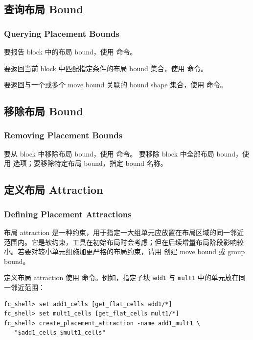\subsection{查询布局 Bound}
\subsubsection*{Querying Placement Bounds}

要报告 block 中的布局 bound，使用  命令。

要返回当前 block 中匹配指定条件的布局 bound 集合，使用  命令。

要返回与一个或多个 move bound 关联的 bound shape 集合，使用  命令。

\subsection{移除布局 Bound}
\subsubsection*{Removing Placement Bounds}

要从 block 中移除布局 bound，使用  命令。
要移除 block 中全部布局 bound，使用  选项；要移除特定布局 bound，指定 bound 名称。

\subsection{定义布局 Attraction}
\subsubsection*{Defining Placement Attractions}

布局 attraction 是一种约束，用于指定一大组单元应放置在布局区域的同一邻近范围内。它是软约束，工具在初始布局时会考虑；但在后续增量布局阶段影响较小。若要对较小单元组施加更严格的布局约束，请用  创建 move bound 或 group bound。

定义布局 attraction 使用  命令。例如，指定子块 \texttt{add1} 与 \texttt{mult1} 中的单元放在同一邻近范围：
\begin{lstlisting}
fc_shell> set add1_cells [get_flat_cells add1/*]
fc_shell> set mult1_cells [get_flat_cells mult1/*]
fc_shell> create_placement_attraction -name add1_mult1 \
   "$add1_cells $mult1_cells"
\end{lstlisting}


